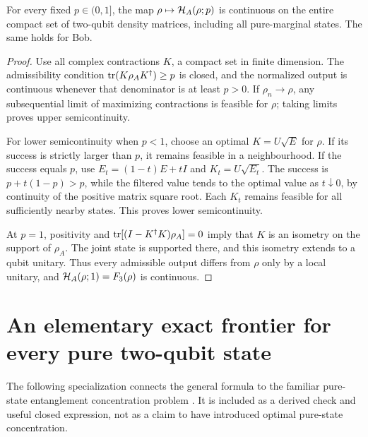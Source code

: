 \begin{theorem}
\label{thm:fixedratecontinuous}
For every fixed $p\in(0,1]$, the map
$\rho\mapsto\mathcal H_A(\rho;p)$ is continuous on the entire compact set of
two-qubit density matrices, including all pure-marginal states.
The same holds for Bob.
\end{theorem}
\begin{proof}
Use all complex contractions $K$, a compact set in finite dimension.
The admissibility condition $\operatorname{tr}(K\rho_AK^\dagger)\geq p$ is closed, and
the normalized output is continuous whenever that denominator is at least
$p>0$. If $\rho_n\to\rho$, any subsequential limit of maximizing
contractions is feasible for $\rho$; taking limits proves upper
semicontinuity.

For lower semicontinuity when $p<1$, choose an optimal
$K=U\sqrt E$ for $\rho$. If its success is strictly larger than $p$,
it remains feasible in a neighbourhood. If the success equals $p$, use
$E_t=(1-t)E+tI$ and $K_t=U\sqrt{E_t}$. The success is
$p+t(1-p)>p$, while the filtered value tends to the optimal value as
$t\downarrow0$, by continuity of the positive matrix square root.
Each $K_t$ remains feasible for all sufficiently nearby states. This
proves lower semicontinuity.

At $p=1$, positivity and
$\operatorname{tr}[(I-K^\dagger K)\rho_A]=0$ imply that $K$ is an isometry on the
support of $\rho_A$. The joint state is supported there, and this isometry
extends to a qubit unitary. Thus every admissible output differs from
$\rho$ only by a local unitary, and
$\mathcal H_A(\rho;1)=F_3(\rho)$ is continuous.
\end{proof}

\section{An elementary exact frontier for every pure two-qubit state}

The following specialization connects the general formula to the familiar
pure-state entanglement concentration problem \cite{vidal}. It is included
as a derived check and useful closed expression, not as a claim to have
introduced optimal pure-state concentration.

